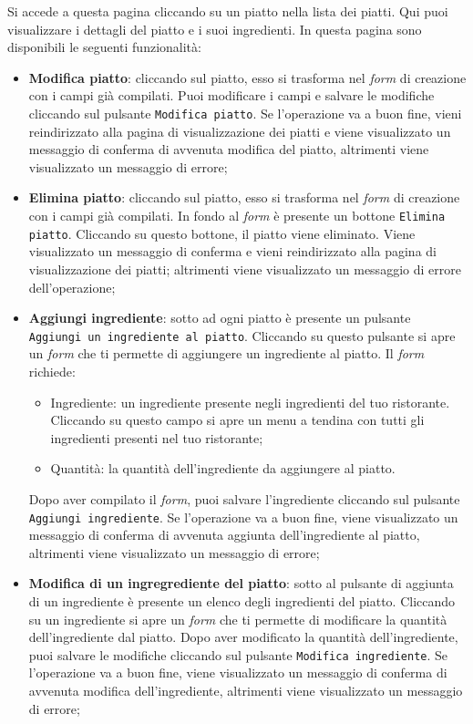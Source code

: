 Si accede a questa pagina cliccando su un piatto nella lista dei piatti. Qui
puoi visualizzare i dettagli del piatto e i suoi ingredienti. In questa pagina
sono disponibili le seguenti funzionalità:
\begin{itemize}
	\item \textbf{Modifica piatto}: cliccando sul piatto, esso si trasforma
		nel \textit{form} di creazione con i campi già compilati. Puoi modificare i
		campi e salvare le modifiche cliccando sul pulsante \texttt{Modifica
		piatto}. Se l'operazione va a buon fine, vieni reindirizzato alla
		pagina di visualizzazione dei piatti e viene visualizzato un messaggio
		di conferma di avvenuta modifica del piatto, altrimenti viene
		visualizzato un messaggio di errore;

	\item \textbf{Elimina piatto}: cliccando sul piatto, esso si trasforma nel
		\textit{form} di creazione con i campi già compilati. In fondo al \textit{form} è presente
		un bottone \texttt{Elimina piatto}. Cliccando su questo bottone, il
		piatto viene eliminato. Viene visualizzato un messaggio di conferma e
		vieni reindirizzato alla pagina di visualizzazione dei piatti; altrimenti 
		viene visualizzato un messaggio di errore dell'operazione;

	\item \textbf{Aggiungi ingrediente}: sotto ad ogni piatto è presente un
		pulsante \texttt{Aggiungi un ingrediente al piatto}. Cliccando su
		questo pulsante si apre un \textit{form} che ti permette di aggiungere un
		ingrediente al piatto. Il \textit{form} richiede:
		\begin{itemize}
			\item Ingrediente: un ingrediente presente negli ingredienti del tuo
				ristorante. Cliccando su questo campo si apre un menu a
				tendina con tutti gli ingredienti presenti nel tuo ristorante;

			\item Quantità: la quantità dell'ingrediente da aggiungere al piatto.
		\end{itemize}
		Dopo aver compilato il \textit{form}, puoi salvare l'ingrediente cliccando sul
		pulsante \texttt{Aggiungi ingrediente}. Se l'operazione va a buon fine,
		viene visualizzato un messaggio di conferma di avvenuta aggiunta
		dell'ingrediente al piatto, altrimenti viene visualizzato un messaggio
		di errore;

	\item \textbf{Modifica di un ingregrediente del piatto}: sotto al pulsante
		di aggiunta di un ingrediente è presente un elenco degli ingredienti
		del piatto. Cliccando su un ingrediente si apre un \textit{form} che ti permette
		di modificare la quantità dell'ingrediente dal piatto. Dopo aver 
		modificato la quantità
		dell'ingrediente, puoi salvare le modifiche cliccando sul pulsante
		\texttt{Modifica ingrediente}. Se l'operazione va a buon fine, viene visualizzato un
		messaggio di conferma di avvenuta modifica dell'ingrediente, altrimenti
		viene visualizzato un messaggio di errore;


\end{itemize}
